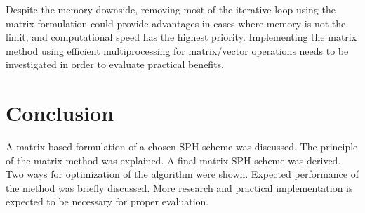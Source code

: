 \documentclass{article}
\begin{document}
Despite the memory downside, removing most of the iterative loop using the matrix formulation could provide advantages in cases where memory is not the limit, and computational speed has the highest priority. Implementing the matrix method using efficient multiprocessing for matrix/vector operations needs to be investigated in order to evaluate practical benefits.
\section{Conclusion}
A matrix based formulation of a chosen SPH scheme was discussed. The principle of the matrix method was explained. A final matrix SPH scheme was derived. Two ways for optimization of the algorithm were shown. Expected performance of the method was briefly discussed. More research and practical implementation is expected to be necessary for proper evaluation.
\end{document}
